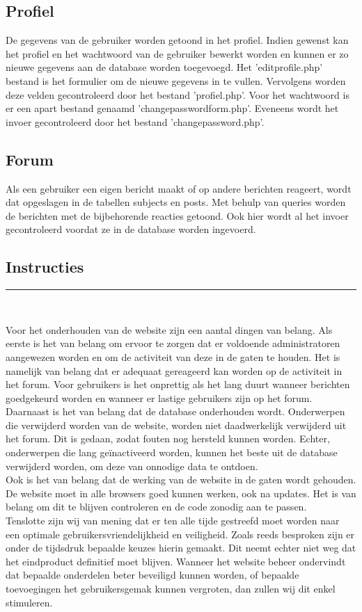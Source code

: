 \documentclass[a4paper,12pt]{article}
\newcommand{\HRule}{\rule{\linewidth}{0.5mm}}
\begin{document}
\subsection[Profiel]{Profiel}
De gegevens van de gebruiker worden getoond in het profiel. Indien gewenst kan het profiel en het wachtwoord van de gebruiker bewerkt worden en kunnen er zo nieuwe gegevens aan de database worden toegevoegd. Het 'editprofile.php' bestand is het formulier om de nieuwe gegevens in te vullen. Vervolgens worden deze velden gecontroleerd door het bestand 'profiel.php'. Voor het wachtwoord is er een apart bestand genaamd 'changepasswordform.php'. Eveneens wordt het invoer gecontroleerd door het bestand 'changepassword.php'. 

\subsection[Forum]{Forum}
Als een gebruiker een eigen bericht maakt of op andere berichten reageert, wordt dat opgeslagen in de tabellen subjects en posts. Met behulp van queries worden de berichten met de bijbehorende reacties getoond. Ook hier wordt al het invoer gecontroleerd voordat ze in de database worden ingevoerd.\\


\begin{center}
\section[Instructies]{Instructies}
\HRule \\[0.5cm]
\end{center}
Voor het onderhouden van de website zijn een aantal dingen van belang. Als eerste is het van belang om ervoor te zorgen dat er voldoende administratoren aangewezen worden en om de activiteit van deze in de gaten te houden. Het is namelijk van belang dat er adequaat gereageerd kan worden op de activiteit in het forum. Voor gebruikers is het onprettig als het lang duurt wanneer berichten goedgekeurd worden en wanneer er lastige gebruikers zijn op het forum.\\
Daarnaast is het van belang dat de database onderhouden wordt. Onderwerpen die verwijderd worden van de website, worden niet daadwerkelijk verwijderd uit het forum. Dit is gedaan, zodat fouten nog hersteld kunnen worden. Echter, onderwerpen die lang geïnactiveerd worden, kunnen het beste uit de database verwijderd worden, om deze van onnodige data te ontdoen.\\
Ook is het van belang dat de werking van de website in de gaten wordt gehouden. De website moet in alle browsers goed kunnen werken, ook na updates. Het is van belang om dit te blijven controleren en de code zonodig aan te passen. \\
Tenslotte zijn wij van mening dat er ten alle tijde gestreefd moet worden naar een optimale gebruikersvriendelijkheid en veiligheid. Zoals reeds besproken zijn er onder de tijdsdruk bepaalde keuzes hierin gemaakt. Dit neemt echter niet weg dat het eindproduct definitief moet blijven. Wanneer het website beheer ondervindt dat bepaalde onderdelen beter beveiligd kunnen worden, of bepaalde toevoegingen het gebruikersgemak kunnen vergroten, dan zullen wij dit enkel stimuleren.
\end{document}
